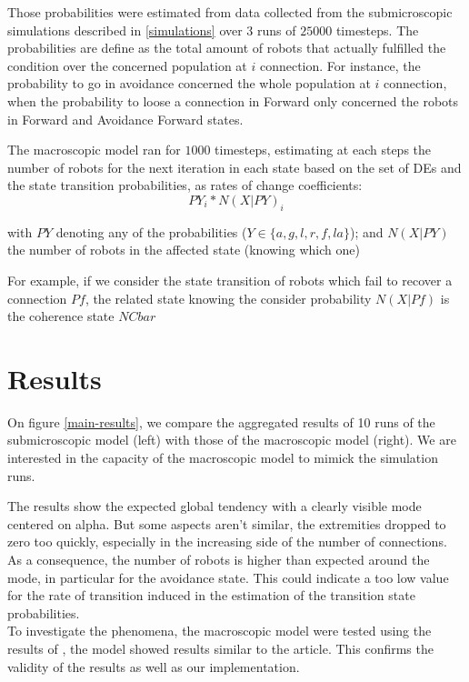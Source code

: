 \documentclass[a4paper, 10pt, conference]{ieeeconf}
\begin{document}
  Those probabilities were estimated from data collected from the submicroscopic simulations described in \ref{simulations} over 3 runs of $25 000$ timesteps. The probabilities are define as the total amount of robots that actually fulfilled the condition over the concerned population at $i$ connection. For instance, the probability to go in avoidance concerned the whole population at $i$ connection, when the probability to loose a connection in Forward only concerned the robots in Forward and Avoidance Forward states.

  The macroscopic model ran for $1000$ timesteps, estimating at each steps the number of robots for the next iteration in each state based on the set of DEs and the state transition probabilities, as rates of change coefficients:
  \[
    PY_i * N(X|PY)_i
  \]

  with $PY$ denoting any of the probabilities ($Y \in \{a, g, l, r, f, la\}$); and $N(X|PY)$ the number of robots in the affected state (knowing which one)

  For example, if we consider the state transition of robots which fail to recover a connection $Pf$, the related state knowing the consider probability $N(X|Pf)$ is the coherence state $NCbar$


\section{Results}
  On figure \ref{main-results}, we compare the aggregated results of 10 runs of the submicroscopic model (left) with those of the macroscopic model (right). We are interested in the capacity of the macroscopic model to mimick the simulation runs.

  The results show the expected global tendency with a clearly visible mode centered on alpha. But some aspects aren't similar, the extremities dropped to zero too quickly, especially in the increasing side of the number of connections. As a consequence, the number of robots is higher than expected around the mode, in particular for the avoidance state. This could indicate a too low value for the rate of transition induced in the estimation of the transition state probabilities.\\

  To investigate the phenomena, the macroscopic model were tested using the results of \cite{Winfield08}, the model showed results similar to the article. This confirms the validity of the results as well as our implementation.
\end{document}
